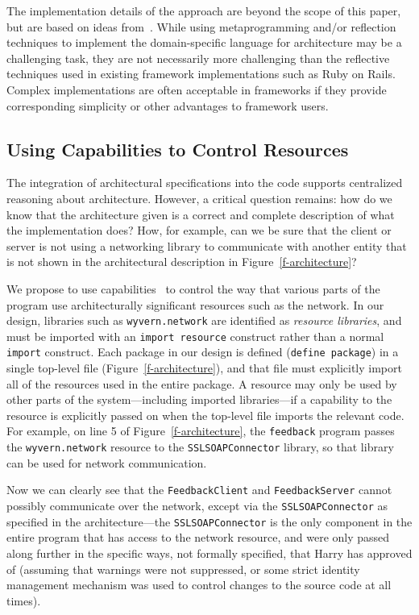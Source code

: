 \documentclass[runningheads]{llncs}
\begin{document}
\begin{sloppypar}
The implementation details of the approach are beyond the scope of this paper, but are based on ideas from~\cite{ASCN03,TSLs-ECOOP14}.  While using metaprogramming and/or reflection techniques to implement the domain-specific language for architecture may be a challenging task, they are not necessarily more challenging than the reflective techniques used in existing framework implementations such as Ruby on Rails.  Complex implementations are often acceptable in frameworks if they provide corresponding simplicity or other advantages to framework users.


\subsection{Using Capabilities to Control Resources}

The integration of architectural specifications into the code supports centralized reasoning about architecture.  However, a critical question remains: how do we know that the architecture given is a correct and complete description of what the implementation does?  How, for example, can we be sure that the client or server is not using a networking library to communicate with another entity that is not shown in the architectural description in Figure~\ref{f-architecture}?

We propose to use capabilities~\cite{Wulf:1974:HKM:355616.364017} to control the way that various parts of the program use architecturally significant resources such as the network.  In our design, libraries such as \texttt{wyvern.network} are identified as \emph{resource libraries}, and must be imported with an \texttt{import resource} construct rather than a normal \texttt{import} construct.  Each package in our design is defined (\texttt{define package}) in a single top-level file (Figure~\ref{f-architecture}), and that file must explicitly import all of the resources used in the entire package.  A resource may only be used by other parts of the system---including imported libraries---if a capability to the resource is explicitly passed on when the top-level file imports the relevant code.  For example, on line 5 of Figure~\ref{f-architecture}, the \texttt{feedback} program passes the \texttt{wyvern.network} resource to the \texttt{SSLSOAPConnector} library, so that library can be used for network communication.

Now we can clearly see that the \texttt{FeedbackClient} and \texttt{FeedbackServer} cannot possibly communicate over the network, except via the \texttt{SSLSOAPConnector} as specified in the architecture---the \texttt{SSLSOAPConnector} is the only component in the entire program that has access to the network resource, and were only passed along further in the specific ways, not formally specified, that Harry has approved of (assuming that warnings were not suppressed, or some strict identity management mechanism was used to control changes to the source code at all times).


\end{sloppypar}
\end{document}
